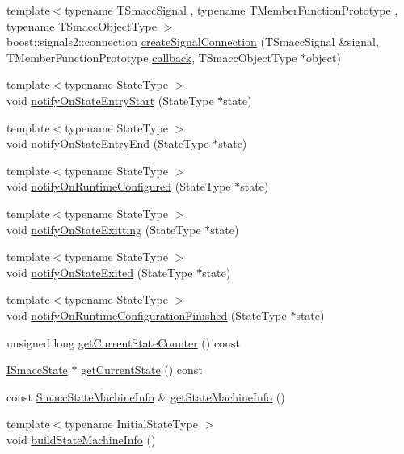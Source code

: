 \begin{DoxyCompactItemize}
\item 
{\footnotesize template$<$typename T\+Smacc\+Signal , typename T\+Member\+Function\+Prototype , typename T\+Smacc\+Object\+Type $>$ }\\boost\+::signals2\+::connection \hyperlink{classsmacc_1_1ISmaccStateMachine_adf0f42ade0c65cc471960fe2a7c42da2}{create\+Signal\+Connection} (T\+Smacc\+Signal \&signal, T\+Member\+Function\+Prototype \hyperlink{sm__ridgeback__barrel__search__2_2servers_2opencv__perception__node_2opencv__perception__node_8cpp_a050e697bd654facce10ea3f6549669b3}{callback}, T\+Smacc\+Object\+Type $\ast$object)
\item 
{\footnotesize template$<$typename State\+Type $>$ }\\void \hyperlink{classsmacc_1_1ISmaccStateMachine_aeec54e997d715b105ebfeb5caadc4fbf}{notify\+On\+State\+Entry\+Start} (State\+Type $\ast$state)
\item 
{\footnotesize template$<$typename State\+Type $>$ }\\void \hyperlink{classsmacc_1_1ISmaccStateMachine_a856cf2d25d84659b974cccfbf44aeec9}{notify\+On\+State\+Entry\+End} (State\+Type $\ast$state)
\item 
{\footnotesize template$<$typename State\+Type $>$ }\\void \hyperlink{classsmacc_1_1ISmaccStateMachine_a7377ca0f79289fdc27f9ed3ff6e67263}{notify\+On\+Runtime\+Configured} (State\+Type $\ast$state)
\item 
{\footnotesize template$<$typename State\+Type $>$ }\\void \hyperlink{classsmacc_1_1ISmaccStateMachine_a707c36f8b02eeed1af624dd36a5a4957}{notify\+On\+State\+Exitting} (State\+Type $\ast$state)
\item 
{\footnotesize template$<$typename State\+Type $>$ }\\void \hyperlink{classsmacc_1_1ISmaccStateMachine_ac352013a5df0dcce0594f1466b9a6f7b}{notify\+On\+State\+Exited} (State\+Type $\ast$state)
\item 
{\footnotesize template$<$typename State\+Type $>$ }\\void \hyperlink{classsmacc_1_1ISmaccStateMachine_a0a561ebd12c874a9fa85ba75b740871b}{notify\+On\+Runtime\+Configuration\+Finished} (State\+Type $\ast$state)
\item 
unsigned long \hyperlink{classsmacc_1_1ISmaccStateMachine_aad27c0182b53245d0aded22e63cd83bd}{get\+Current\+State\+Counter} () const
\item 
\hyperlink{classsmacc_1_1ISmaccState}{I\+Smacc\+State} $\ast$ \hyperlink{classsmacc_1_1ISmaccStateMachine_a610d09dc5341fb63732be713c21fbe86}{get\+Current\+State} () const
\item 
const \hyperlink{classsmacc_1_1introspection_1_1SmaccStateMachineInfo}{Smacc\+State\+Machine\+Info} \& \hyperlink{classsmacc_1_1ISmaccStateMachine_a3b1facb0477325fe43b447fc21d9eb7d}{get\+State\+Machine\+Info} ()
\item 
{\footnotesize template$<$typename Initial\+State\+Type $>$ }\\void \hyperlink{classsmacc_1_1ISmaccStateMachine_a8e9c16ed0dc3dfc878548a8c6f3c47d7}{build\+State\+Machine\+Info} ()
\end{DoxyCompactItemize}
